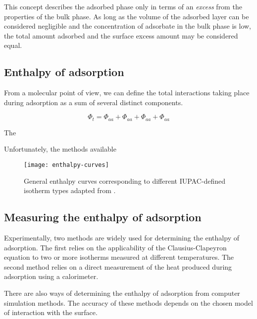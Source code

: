 This concept describes the adsorbed phase only in terms
of an \textit{excess} from the properties of the bulk phase. 
As long as the volume of the adsorbed layer can be considered 
negligible and the concentration of adsorbate in the bulk 
phase is low, the total amount adsorbed and the surface excess
amount may be considered equal.

\subsection{Enthalpy of adsorption}

From a molecular point of view, we can define the total
interactions taking place during adsorption as a sum of 
several distinct components.

\begin{equation}\label{calo:eqn:interactions}
  \Phi_t = \Phi_{aa} + \Phi_{aa} + \Phi_{aa} + \Phi_{aa}
\end{equation}

The 

Unfortunately, the methods available 

\begin{figure}[htb]
    \centering

    \texttt{[image: enthalpy-curves]}
    \caption{
      General enthalpy curves corresponding to different 
      IUPAC-defined isotherm 
      types adapted from \citeauthor{llewellynGasAdsorptionMicrocalorimetry2005}%
      \cite{llewellynGasAdsorptionMicrocalorimetry2005}.
    }%
    \label{calo:fig:enthalpy-iupac-iso}

\end{figure}


\subsection{Measuring the enthalpy of adsorption}

Experimentally, two methods are widely used for determining the 
enthalpy of adsorption. The first relies on the applicability of the 
Clausius-Clapeyron equation to two or more isotherms measured 
at different temperatures. The second method relies on a 
direct measurement of the heat produced during adsorption 
using a calorimeter.

There are also ways of determining the enthalpy of adsorption
from computer simulation methods. The accuracy of these methods
depends on the chosen model of interaction with the surface.

